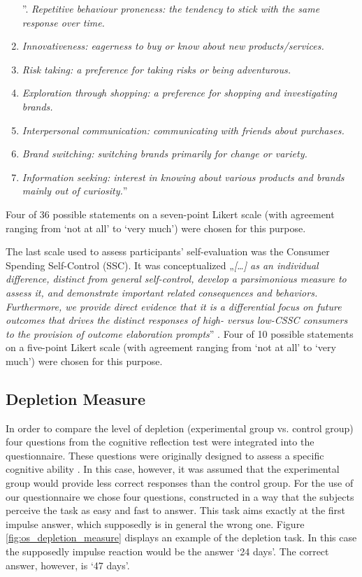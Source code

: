 \begin{enumerate}[label=\emph{\alph*}.]
\item [”\stepcounter{enumi}\emph{\alph{enumi}}.]\emph{Repetitive behaviour proneness: the tendency to stick with the same response over time. }
\item \emph{Innovativeness: eagerness to buy or know about new products/services. }
\item \emph{Risk taking: a preference for taking risks or being adventurous. }
\item \emph{Exploration through shopping: a preference for shopping and investigating brands. }
\item \emph{Interpersonal communication: communicating with friends about purchases. }
\item \emph{Brand switching: switching brands primarily for change or variety. }
\item \emph{Information seeking: interest in knowing about various products and brands mainly out of curiosity.}” \citep{raju1980optimum}
\end{enumerate}
Four of 36 possible statements on a seven-point Likert scale (with agreement ranging from ‘not at all’ to ‘very much’) were chosen for this purpose.\par
The last scale used to assess participants’ self-evaluation was the Consumer Spending Self-Control (SSC). It was conceptualized „\emph{[\ldots] as an individual difference, distinct from general self-control, develop a parsimonious measure to assess it, and demonstrate important related consequences and behaviors. Furthermore, we provide direct evidence that it is a differential focus on future outcomes that drives the distinct responses of high- versus low-CSSC consumers to the provision of outcome elaboration prompts}” \citep{haws2012consumer}. Four of 10 possible statements on a five-point Likert scale (with agreement ranging from ‘not at all’ to ‘very much’) were chosen for this purpose.\par

\subsection{Depletion Measure}
In order to compare the level of depletion (experimental group vs. control group) four questions from the cognitive reflection test were integrated into the questionnaire. These questions were originally designed to assess a specific cognitive ability \citep{frederick2005cognitive}. In this case, however, it was assumed that the experimental group would provide less correct responses than the control group. For the use of our questionnaire we chose four questions, constructed in a way that the subjects perceive the task as easy and fast to answer. This task aims exactly at the first impulse answer, which supposedly is in general the wrong one.  Figure \ref{fig:os_depletion_measure} displays an example of the depletion task. In this case the supposedly impulse reaction would be the answer ‘24 days’. The correct answer, however, is ‘47 days’.  \par

